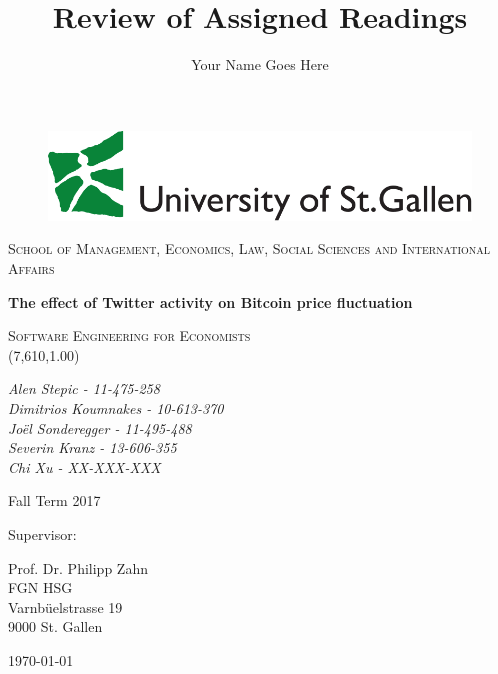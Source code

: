 \documentclass[a4paper,american,12pt]{article}
\title{Review of Assigned Readings}
\author{Your Name Goes Here}
\begin{document}
\begin{titlepage}
	\begin{figure}
	\centering
	\includegraphics[scale=0.32]{logohsg}
	\end{figure}
\centering
{\scshape\large School of Management, Economics, Law, Social Sciences and International Affairs \par}
\vspace{2.0cm}
{\huge\bfseries The effect of Twitter activity on Bitcoin price fluctuation  \par}
\vspace{2.0cm}
{\scshape\Large Software Engineering for Economists \\(7,610,1.00) \par}
\vspace{2.0cm}
{\itshape\large Alen Stepic - 11-475-258 \\Dimitrios Koumnakes - 10-613-370 \\Joël Sonderegger - 11-495-488 \\Severin Kranz - 13-606-355 \\Chi Xu - XX-XXX-XXX \par}
	\begin{spacing}{1}
	\vspace{1.2cm}
	{Fall Term 2017 \par}
	\vspace{1.2cm}
	Supervisor:\\
	{Prof. Dr. Philipp Zahn\\ FGN HSG\\ Varnbüelstrasse 19\\ 9000 St. Gallen \par}
	\end{spacing}
\vfill
{\large \today\par}
\end{titlepage}
    
\clearpage
    
\end{document}
